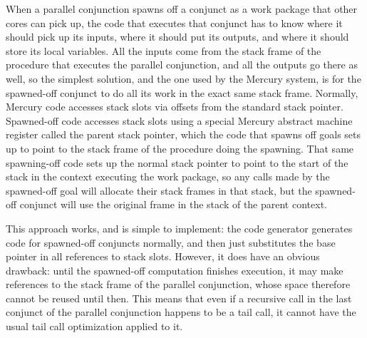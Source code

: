 When a parallel conjunction spawns off a conjunct
as a work package that other cores can pick up,
the code that executes that conjunct has to know
where it should pick up its inputs,
where it should put its outputs,
and where it should store its local variables.
All the inputs come from the stack frame of the procedure
that executes the parallel conjunction,
and all the outputs go there as well,
so the simplest solution, and the one used by the Mercury system,
is for the spawned-off conjunct to do all its work
in the exact same stack frame.
Normally, Mercury code accesses stack slots
via offsets from the standard stack pointer.
Spawned-off code accesses stack slots using
a special Mercury abstract machine register
called the parent stack pointer,
which the code that spawns off goals
sets up to point to the stack frame of the procedure doing the spawning.
That same spawning-off code sets up the normal stack pointer
to point to the start of the stack in the context executing the work package,
so any calls made by the spawned-off goal
will allocate their stack frames in that stack,
but the spawned-off conjunct will use
the original frame in the stack of the parent context.

This approach works, and is simple to implement:
the code generator generates code for spawned-off conjuncts normally,
and then just substitutes the base pointer in all references to stack slots.
However, it does have an obvious drawback:
until the spawned-off computation finishes execution,
it may make references to the stack frame of the parallel conjunction,
whose space therefore cannot be reused until then.
This means that even if
a recursive call in the last conjunct of the parallel conjunction
happens to be a tail call,
it cannot have the usual tail call optimization applied to it.

